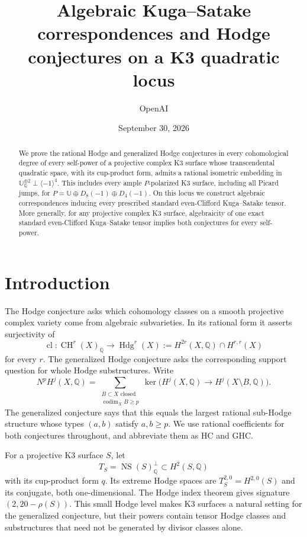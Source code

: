 \documentclass[11pt]{amsart}
\title[Hodge conjectures on a K3 quadratic locus]{Algebraic Kuga--Satake correspondences and Hodge conjectures on a K3 quadratic locus}
\author{OpenAI}
\date{September 30, 2026}
\newcommand{\Q}{\mathbb Q}
\DeclareMathOperator{\NS}{NS}
\DeclareMathOperator{\CH}{CH}
\DeclareMathOperator{\cl}{cl}
\DeclareMathOperator{\Hdg}{Hdg}
\theoremstyle{definition}
\theoremstyle{remark}
\numberwithin{equation}{section}
\begin{document}
\begin{abstract}
We prove the rational Hodge and generalized Hodge conjectures in every
cohomological degree of every self-power of a projective complex K3
surface whose transcendental quadratic space, with its cup-product form,
admits a rational isometric embedding in
$\mathbb U_{\Q}^{\oplus2}\perp\langle-1\rangle^4$.
This includes every ample $P$-polarized K3 surface, including all Picard jumps,
for $P=\mathbb U\oplus D_8(-1)\oplus D_4(-1)$.
On this locus we construct algebraic correspondences inducing every
prescribed standard even-Clifford Kuga--Satake tensor.  More generally,
for any projective complex K3 surface, algebraicity of one exact standard
even-Clifford Kuga--Satake tensor implies both conjectures for every self-power.
\end{abstract}
\maketitle
\tableofcontents

\section{Introduction}
\label{intro:section}

The Hodge conjecture asks which cohomology classes on a smooth
projective complex variety come from algebraic subvarieties.  In its
rational form it asserts surjectivity of
\[
 \cl:\CH^r(X)_{\Q}\longrightarrow
 \Hdg^r(X):=H^{2r}(X,\Q)\cap H^{r,r}(X)
\]
for every $r$.  The generalized Hodge conjecture asks the corresponding
support question for whole Hodge substructures.  Write
\[
 N^pH^j(X,\Q)=
 \sum_{\substack{B\subset X\text{ closed}\\\operatorname{codim}_X B\ge p}}
 \ker\bigl(H^j(X,\Q)\longrightarrow H^j(X\setminus B,\Q)\bigr).
\]
The generalized conjecture says that this equals the largest rational
sub-Hodge structure whose types $(a,b)$ satisfy $a,b\ge p$.
We use rational coefficients for both conjectures throughout, and
abbreviate them as HC and GHC.

For a projective K3 surface $S$, let
\[
 T_S=\NS(S)_{\Q}^{\perp}\subset H^2(S,\Q)
\]
with its cup-product form $q$.  Its extreme Hodge spaces are
$T_S^{2,0}=H^{2,0}(S)$ and its conjugate, both one-dimensional.
The Hodge index theorem gives signature $(2,20-\rho(S))$.
This small Hodge level makes K3 surfaces a natural setting for the
generalized conjecture, but their powers contain tensor Hodge classes
and substructures that need not be generated by divisor classes alone.
\end{document}
